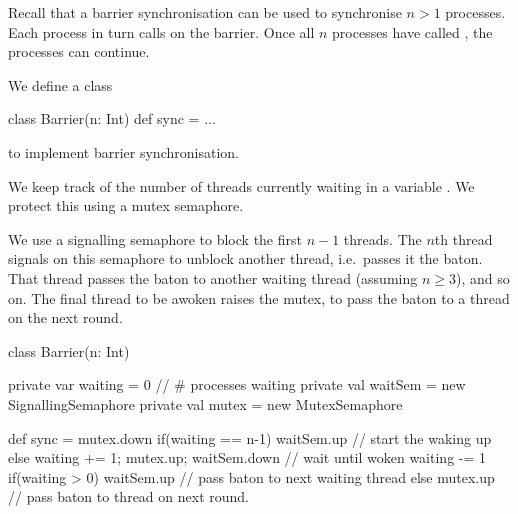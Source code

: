 

\begin{slide}

Recall that a barrier synchronisation can be used to synchronise $n>1$
processes.  Each process in turn calls  on the barrier.  Once all
$n$ processes have called , the processes can continue.



We define a class
\begin{scala}
class Barrier(n: Int){ def sync = { ... } }
\end{scala}%
%
to implement barrier synchronisation.  

We keep track of the number of threads currently waiting in a variable
.  We protect this using a mutex semaphore. 

We use a signalling semaphore  to block the first $n-1$
threads.  The $n$th thread signals on this semaphore to unblock
another thread, i.e.~passes it the baton.  That thread passes the
baton to another waiting thread (assuming $n \ge 3$), and so on.  The
final thread to be awoken raises the mutex, to pass the baton to a
thread on the next round.
\end{slide}



\begin{slide}

\begin{scala}
class Barrier(n: Int){
  private var waiting = 0 // # processes waiting
  private val waitSem = new SignallingSemaphore
  private val mutex = new MutexSemaphore

  def sync = {
    mutex.down
    if(waiting == n-1) waitSem.up // start the waking up
    else{ 
      waiting += 1; mutex.up; waitSem.down  // wait until woken
      waiting -= 1
      if(waiting > 0) waitSem.up // pass baton to next waiting thread
      else mutex.up // pass baton to thread on next round.
    }
  }
}
\end{scala}

\end{slide}

